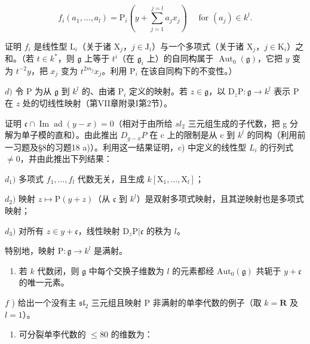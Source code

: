 \[
f _ {i} \left(a _ {1}, \dots , a _ {l}\right) = \mathrm{P} _ {i} \left(y + \sum_ {j = 1} ^ {j = l} a _ {j} x _ {j}\right) \quad \text { for } \left(a _ {j}\right) \in k ^ {l}.
\]

证明 \(f_{i}\) 是线性型 \(\mathrm{L}_i\)（关于诸 \(\mathrm{X}_j\)，\(j \in \mathrm{J}_i\)）与一个多项式（关于诸 \(\mathrm{X}_j\)，\(j \in \mathrm{K}_i\)）之和。（若 \(t \in k^*\)，则 \(\mathfrak{g}\) 上等于 \(t^i\)（在 \(\mathfrak{g}_i\) 上）的自同构属于 \(\operatorname{Aut}_0(\mathfrak{g})\)，它把 \(y\) 变为 \(t^{-2}y\)，把 \(x_j\) 变为 \(t^{2m_j}x_j\)。利用 \(\mathrm{P}_i\) 在该自同构下的不变性。）

\(d)\) 令 \(\mathrm{P}\) 为从 \(\mathfrak{g}\) 到 \(k^l\) 的、由诸 \(\mathrm{P}_i\) 定义的映射。若 \(z \in \mathfrak{g}\)，以 \(\mathrm{D}_z\mathrm{P} : \mathfrak{g} \to k^l\) 表示 \(\mathrm{P}\) 在 \(z\) 处的切线性映射（第VII章附录I第2节）。

证明 \(\mathfrak{c}\cap\operatorname{Im}\operatorname{ad}(y-x)=0\)（相对于由所给 \(sl_{2}\) 三元组生成的子代数，把 g 分解为单子模的直和）。由此推出 \(D_{y-x}P\) 在 c 上的限制是从 c 到 \(k^{l}\) 的同构（利用前一习题及§8的习题18 a)）。利用这一结果证明，c) 中定义的线性型 \(L_{i}\) 的行列式 \(\neq0\)，并由此推出下列结果：

\(d_{1})\) 多项式 \(f_{1},\ldots ,f_{l}\) 代数无关，且生成 \(k[\mathrm{X}_1,\dots ,\mathrm{X}_l]\)；

\(d_{2})\) 映射 \(z \mapsto \mathrm{P}(y + z)\)（从 \(\mathfrak{c}\) 到 \(k^{l}\)）是双射多项式映射，且其逆映射也是多项式映射；

\(d_{3})\) 对所有 \(z\in y + \mathfrak{c}\)，线性映射 \(\mathrm{D}_z\mathrm{P}|\mathfrak{c}\) 的秩为 \(l\)。

特别地，映射 \(\mathrm{P}:\mathfrak{g}\to k^l\) 是满射。

\begin{enumerate}
\def\labelenumi{\alph{enumi})}
\setcounter{enumi}{4}
\tightlist
\item
  若 \(k\) 代数闭，则 \(\mathfrak{g}\) 中每个交换子维数为 \(l\) 的元素都经 \(\mathrm{Aut}_0(\mathfrak{g})\) 共轭于 \(y + \mathfrak{c}\) 的唯一元素。
\end{enumerate}

\(f\) ) 给出一个没有主 \(\mathfrak{sl}_2\) 三元组且映射 \(\mathrm{P}\) 非满射的单李代数的例子（取 \(k = \mathbf{R}\) 及 \(l = 1\)）。


\begin{enumerate}
\def\labelenumi{\arabic{enumi})}
\tightlist
\item
  可分裂单李代数的 \(\leq 80\) 的维数为：
\end{enumerate}

